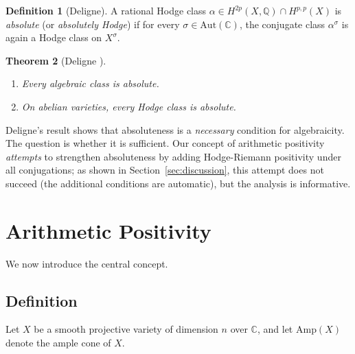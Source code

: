 \documentclass[aps,prd,twocolumn,superscriptaddress,nofootinbib]{revtex4-2}
\newtheorem{theorem}{Theorem}[section]
\theoremstyle{definition}
\newtheorem{definition}[theorem]{Definition}
\theoremstyle{remark}
\begin{document}
\begin{definition}[Deligne]
\label{def:absolute}
A rational Hodge class $\alpha \in H^{2p}(X, \mathbb{Q}) \cap H^{p,p}(X)$ is \textit{absolute} (or \textit{absolutely Hodge}) if for every $\sigma \in \mathrm{Aut}(\mathbb{C})$, the conjugate class $\alpha^\sigma$ is again a Hodge class on $X^\sigma$.
\end{definition}

\begin{theorem}[Deligne \cite{Deligne1982}]
\label{thm:deligne_absolute}
\begin{enumerate}
\item Every algebraic class is absolute.
\item On abelian varieties, every Hodge class is absolute.
\end{enumerate}
\end{theorem}

Deligne's result shows that absoluteness is a \textit{necessary} condition for algebraicity. The question is whether it is sufficient. Our concept of arithmetic positivity \textit{attempts} to strengthen absoluteness by adding Hodge-Riemann positivity under all conjugations; as shown in Section~\ref{sec:discussion}, this attempt does not succeed (the additional conditions are automatic), but the analysis is informative.


\section{Arithmetic Positivity}
\label{sec:arithmetic_positivity}

We now introduce the central concept.

\subsection{Definition}

Let $X$ be a smooth projective variety of dimension $n$ over $\mathbb{C}$, and let $\mathrm{Amp}(X)$ denote the ample cone of $X$.
\end{document}

